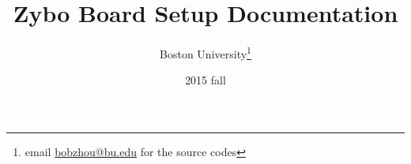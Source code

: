 %  

\documentclass[12pt]{article} %




\title{Zybo Board Setup Documentation}
\date{2015 fall}
\author{ 
  Boston University\thanks{email \href{mailto:bobzhou@bu.edu}{bobzhou@bu.edu} 
    for the source codes}
}


        \maketitle
        
        \section *{Motivation}
        \label{sec:motivation}
        Zybo board contains an ARM core and an FPGA for both GPP (General Purpose Processor)
        calculations and high-performance calculations with FPGA. The setup for the Zybo board is
        pretty awkward, since student does not have unlimited license for the board compiler,
        vivado. This documentation provides an convenient way in setting up compiling, synthesis and
        mapping tutorials for Zybo board. The purpose is that the board can eventually self-tunned
        to functional specific high-performance computing as GPP needed. 
        \pagebreak
        \tableofcontents

